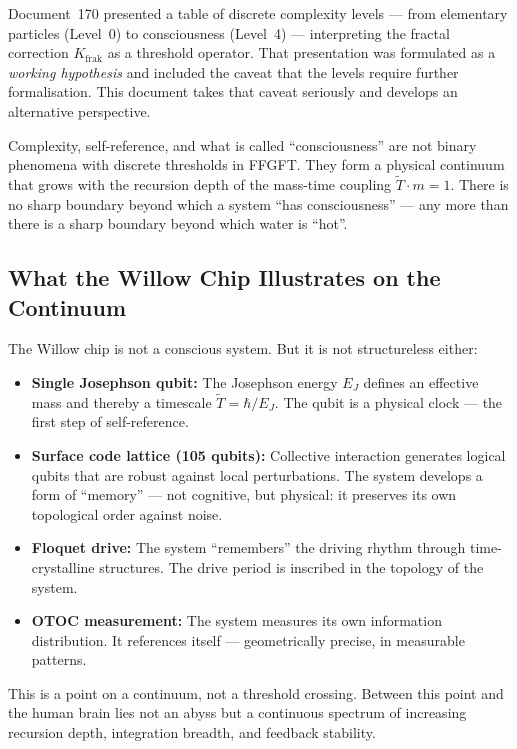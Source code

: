 Document~170 presented a table of discrete complexity levels — from elementary
particles (Level~0) to consciousness (Level~4) — interpreting the fractal correction
$K_\text{frak}$ as a threshold operator. That presentation was formulated as a
\textit{working hypothesis} and included the caveat that the levels require further
formalisation. This document takes that caveat seriously and develops an alternative
perspective.

\begin{important}
Complexity, self-reference, and what is called ``consciousness'' are not binary
phenomena with discrete thresholds in FFGFT.
They form a physical continuum that grows with the recursion depth of the
mass-time coupling $\tilde{T} \cdot m = 1$.
There is no sharp boundary beyond which a system ``has consciousness'' — any more
than there is a sharp boundary beyond which water is ``hot''.
\end{important}

\subsection{What the Willow Chip Illustrates on the Continuum}

The Willow chip is not a conscious system. But it is not structureless either:

\begin{itemize}
    \item \textbf{Single Josephson qubit:} The Josephson energy $E_J$ defines an
    effective mass and thereby a timescale $\tilde{T} = \hbar/E_J$. The qubit is a
    physical clock — the first step of self-reference.
    \item \textbf{Surface code lattice (105 qubits):} Collective interaction generates
    logical qubits that are robust against local perturbations. The system develops a
    form of ``memory'' — not cognitive, but physical: it preserves its own topological
    order against noise.
    \item \textbf{Floquet drive:} The system ``remembers'' the driving rhythm through
    time-crystalline structures. The drive period is inscribed in the topology of the
    system.
    \item \textbf{OTOC measurement:} The system measures its own information
    distribution. It references itself — geometrically precise, in measurable patterns.
\end{itemize}

This is a point on a continuum, not a threshold crossing. Between this point and the
human brain lies not an abyss but a continuous spectrum of increasing recursion depth,
integration breadth, and feedback stability.

